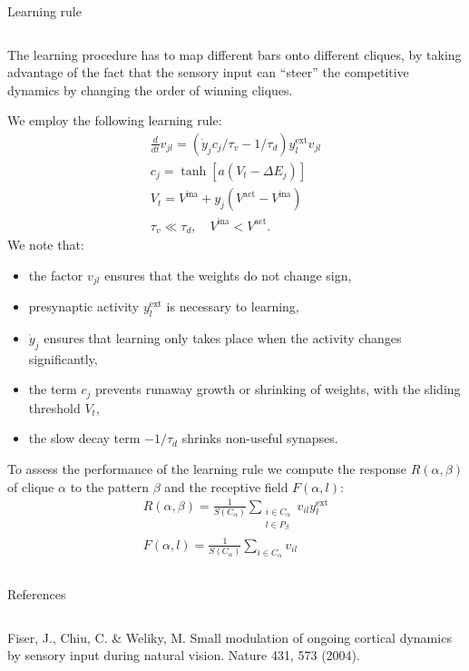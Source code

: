 \documentclass[final,hyperref={pdfpagelabels=false}]{beamer}
\begin{document}
\begin{frame}
\begin{columns}
\begin{column}{.64\textwidth}
\begin{minipage}[T]{.95\textwidth}
{\begin{block}{Learning rule}
\begin{columns}
				\begin{column}[T]{.6\textwidth}
				The learning procedure has to map different bars onto different cliques, by taking advantage of the fact that the sensory input can ``steer'' the competitive dynamics by changing the order of winning cliques.
					
				We employ the following learning rule:
				\begin{gather*}
					\frac{d}{dt} v_{jl} = \left(\dot{y}_j c_j / \tau_v  - 1 / \tau_d\right) y_l^{\text{ext}} v_{jl}  \\
					c_j = \tanh{\left[a \left(V_t - \Delta E_j \right)\right]} \\
					V_t = V^{\text{ina}} + y_j \left(V^{\text{act}} - V^{\text{ina}}\right)\\
					\tau_v \ll \tau_d, \quad V^{\text{ina}} < V^{\text{act}}.	
				\end{gather*}
				We note that:
				\begin{itemize}
					\item the factor $v_{jl}$ ensures that the weights do not change sign,
					\item presynaptic activity $y_l^{\text{ext}}$ is necessary to learning,
					\item $\dot{y}_j$ ensures that learning only takes place when the activity changes significantly,
					\item the term $c_j$ prevents runaway growth or shrinking of weights, with the sliding threshold $V_t$,
					\item the slow decay term $-1/\tau_d$ shrinks non-useful synapses.
				\end{itemize}
				To assess the performance of the learning rule we compute the response $R(\alpha, \beta)$ of clique $\alpha$ to the pattern $\beta$ and the receptive field $F(\alpha, l)$:
				\begin{gather*}
					R(\alpha, \beta) = \frac{1}{S(C_\alpha)} \sum_{\substack{i\in C_\alpha \\ l \in P_\beta}} v_{il} y_l^{\text{ext}} \\
					F(\alpha, l) = \frac{1}{S(C_\alpha)} \sum_{i\in C_\alpha} v_{il}
				\end{gather*}
					
				\end{column}
			\end{columns}
				
			
			\end{block}
			

			\vfill
			\begin{refblock}{References}
			\begin{columns}
 				\begin{thebibliography}{1}
				\begin{column}[T]{.46\textwidth}
					Fiser, J., Chiu, C. \& Weliky, M. Small modulation of ongoing cortical dynamics by sensory input during natural vision. Nature 431, 573 (2004).
							

\end{column}
\end{thebibliography}
\end{columns}
\end{refblock}}
\end{minipage}
\end{column}
\end{columns}
\end{frame}
\end{document}
